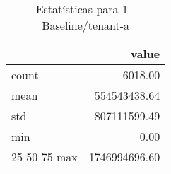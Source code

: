 \begin{table}[htbp]
\caption{Estatísticas para 1 - Baseline/tenant-a}
\label{tab:1_-_baseline_tenant-a_summary}
\begin{tabular}{lr}
\toprule
 & value \\
\midrule
count & 6018.00 \\
mean & 554543438.64 \\
std & 807111599.49 \\
min & 0.00 \\
25%
50%
75%
max & 1746994696.60 \\
\bottomrule
\end{tabular}
\end{table}
